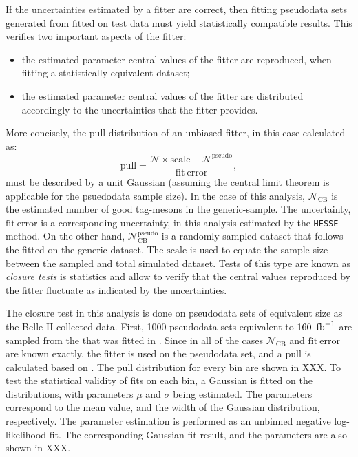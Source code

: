 If the uncertainties estimated by a fitter are correct, then fitting pseudodata sets generated from  fitted on test data must yield statistically compatible results.
This verifies two important aspects of the fitter:
\begin{itemize}
    \item the estimated parameter central values of the fitter are reproduced, when fitting a statistically equivalent dataset;
    \item the estimated parameter central values of the fitter are distributed accordingly to the uncertainties that the fitter provides.
\end{itemize}

More concisely, the pull distribution of an unbiased fitter, in this case calculated as:
\begin{equation}\label{eq:toy_pull}
    \mathrm{pull} = \frac{\mathcal{N}\times \mathrm{scale} - \mathcal{N}^{\mathrm{pseudo}}}{\mathrm{fit~error}},
\end{equation}
must be described by a unit Gaussian (assuming the central limit theorem is applicable for the psuedodata sample size).
In the case of this analysis, $\mathcal{N}_{\mathrm{CB}}$ is the estimated number of good tag-\B mesons in the generic-\MC sample.
The uncertainty, $\mathrm{fit~error}$ is a corresponding uncertainty, in this analysis estimated by the \texttt{HESSE} method.
On the other hand, $\mathcal{N}^{\mathrm{pseudo}}_{\mathrm{CB}}$ is a randomly sampled dataset that follows the  fitted on the generic-\MC dataset.
The $\mathrm{scale}$ is used to equate the sample size between the sampled and total simulated dataset.
Tests of this type are known as \textit{closure tests} is statistics and allow to verify that the central values reproduced by the fitter fluctuate as indicated by the \PDF uncertainties.

The closure test in this analysis is done on pseudodata sets of equivalent size as the Belle II collected data.
First, 1000 pseudodata sets equivalent to $\mathrm{160~\mbox{\,fb}^{-1}}$ are sampled from the \PDF that was fitted in .
Since in all of the cases $\mathcal{N}_{\mathrm{CB}}$ and $\mathrm{fit~error}$ are known exactly, the \Mbc fitter is used on the pseudodata set, and a $\mathrm{pull}$ is calculated based on .
The pull distribution for every \EB bin are shown in XXX.
To test the statistical validity of \Mbc fits on each bin, a Gaussian \PDF is fitted on the distributions, with parameters $\mu$ and $\sigma$ being estimated.
The parameters correspond to the mean value, and the width of the Gaussian distribution, respectively.
The parameter estimation is performed as an unbinned negative log-likelihood fit.
The corresponding Gaussian fit result, and the parameters are also shown in XXX.
